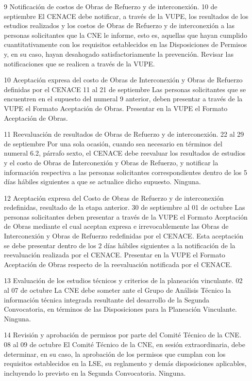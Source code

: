  9
 Notificación de costos de Obras de Refuerzo y de interconexión.
 10 de septiembre
 El CENACE debe notificar, a través de la VUPE, los resultados de los estudios realizados y los costos de Obras de Refuerzo y de interconexión a las personas solicitantes que la CNE le informe, esto es, aquellas que hayan cumplido cuantitativamente con los requisitos establecidos en las Disposiciones de Permisos y, en su caso, hayan desahogado satisfactoriamente la prevención.
 Revisar las notificaciones que se realicen a través de la VUPE.
 
 10
 Aceptación expresa del costo de Obras de Interconexión y Obras de Refuerzo definidas por el CENACE
 11 al 21 de septiembre
 Las personas solicitantes que se encuentren en el supuesto del numeral 9 anterior, deben presentar a través de la VUPE el Formato Aceptación de Obras.
 Presentar en la VUPE el Formato Aceptación de Obras.
 
 11
 Reevaluación de resultados de Obras de Refuerzo y de interconexión.
 22 al 29 de septiembre
 Por una sola ocasión, cuando sea necesario en términos del numeral 6.2, párrafo sexto, el CENACE debe reevaluar los resultados de estudios y el costo de Obras de Interconexión y Obras de Refuerzo, y notificar la información respectiva a las personas solicitantes correspondientes dentro de los 5 días hábiles siguientes a que se actualice dicho supuesto.
 Ninguna.
 
 12
 Aceptación expresa del Costo de Obras de Refuerzo y de interconexión redefinidas, resultado de la etapa anterior.
 30 de septiembre al 01 de octubre
 Las personas solicitantes deben presentar a través de la VUPE el Formato Aceptación de Obras mediante el cual aceptan expresa e irrevocablemente las Obras de Interconexión y Obras de Refuerzo redefinidas por el CENACE. Esta aceptación se debe presentar dentro de los 2 días hábiles siguientes a la notificación de la reevaluación realizada por el CENACE.
 Presentar en la VUPE el Formato Aceptación de Obras respecto de la reevaluación notificada por el CENACE.
 
 13
 Evaluación de los estudios técnicos y criterios de la planeación vinculante.
 02 al 07 de octubre
 La CNE debe someter ante el Grupo de Análisis Técnico la información técnica integrada resultante del desarrollo de la Segunda Convocatoria, en términos de las Disposiciones para la Planeación Vinculante.
 Ninguna.
 
 14
 Revisión y aprobación de permisos por parte del Comité Técnico de la CNE.
 08 al 09 de octubre
 El Comité Técnico de la CNE, en sesión extraordinaria, debe determinar, en su caso, la aprobación de los permisos que cumplan con los requisitos establecidos en la LSE, su reglamento y demás disposiciones aplicables, incluyendo lo previsto en la Segunda Convocatoria.
 Ninguna.
 
